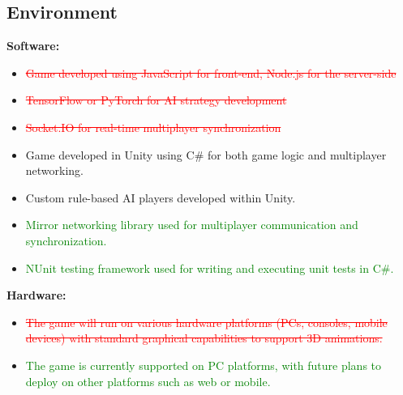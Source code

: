 \documentclass[12pt]{article}
\newcommand{\removed}[1]{\textcolor{red}{\sout{#1}}}
\newcommand{\added}[1]{\textcolor{green}{#1}}
\begin{document}
\subsection*{Environment}

\textbf{Software:}
\begin{itemize}
    \item{\removed {Game developed using JavaScript for front-end, Node.js for the server-side}}
    \item{\removed {TensorFlow or PyTorch for AI strategy development}}
    \item{\removed {Socket.IO for real-time multiplayer synchronization}}
    \item Game developed in Unity using C\# for both game logic and multiplayer networking.
    \item Custom rule-based AI players developed within Unity.
     \item \added{Mirror networking library used for multiplayer communication and synchronization.}
    \item \added{NUnit testing framework used for writing and executing unit tests in C\#.}
\end{itemize}

\textbf{Hardware:}
\begin{itemize}
    \item{\removed{ The game will run on various hardware platforms (PCs, consoles, mobile devices) with standard graphical capabilities to support 3D animations.}}
    \item{\added{ The game is currently supported on PC platforms, with future plans to deploy on other platforms such as web or mobile.}}
\end{itemize}
\end{document}
